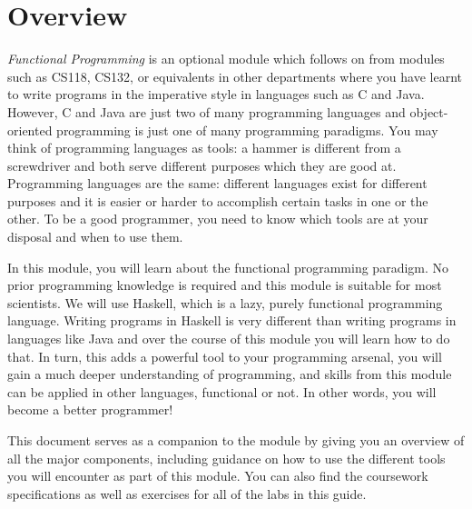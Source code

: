 
\chapter{Overview}

\emph{Functional Programming} is an optional module which follows on from modules such as CS118, CS132, or equivalents in other departments where you have learnt to write programs in the imperative style in languages such as C and Java. However, C and Java are just two of many programming languages and object-oriented programming is just one of many programming paradigms. You may think of programming languages as tools: a hammer is different from a screwdriver and both serve different purposes which they are good at. Programming languages are the same: different languages exist for different purposes and it is easier or harder to accomplish certain tasks in one or the other. To be a good programmer, you need to know which tools are at your disposal and when to use them.

In this module, you will learn about the functional programming paradigm. No prior programming knowledge is required and this module is suitable for most scientists. We will use Haskell, which is a lazy, purely functional programming language. Writing programs in Haskell is very different than writing programs in languages like Java and over the course of this module you will learn how to do that. In turn, this adds a powerful tool to your programming arsenal, you will gain a much deeper understanding of programming, and skills from this module can be applied in other languages, functional or not. In other words, you will become a better programmer!

This document serves as a companion to the module by giving you an overview of all the major components, including guidance on how to use the different tools you will encounter as part of this module. You can also find the coursework specifications as well as exercises for all of the labs in this guide.
